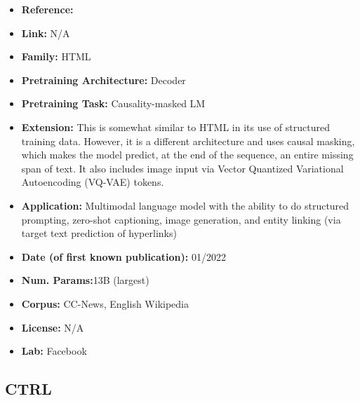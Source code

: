 \documentclass{article}
\begin{document}
            \begin{itemize}
                \item \textbf{Reference:} \href{https://arxiv.org/abs/2201.07520}{}
                \item \textbf{Link:} N/A
                \item \textbf{Family:} HTML 
                \item \textbf{Pretraining Architecture:} Decoder
                \item \textbf{Pretraining Task:} Causality-masked LM
                \item \textbf{Extension:} This is somewhat similar to HTML in its use of structured training data. However, it is a different architecture and uses causal masking, which makes the model predict, at the end of the sequence, an entire missing span of text. It also includes image input via Vector Quantized Variational Autoencoding (VQ-VAE) tokens.
                \item \textbf{Application:} Multimodal language model with the ability to do structured prompting, zero-shot captioning, image generation, and entity linking (via target text prediction of hyperlinks)
                \item \textbf{Date (of first known publication):} 01/2022
                \item \textbf{Num. Params:}13B (largest)
                \item \textbf{Corpus:} CC-News, English Wikipedia
                \item \textbf{License:} N/A
                \item \textbf{Lab:} Facebook
            \end{itemize}

\subsection{CTRL}
\end{document}
